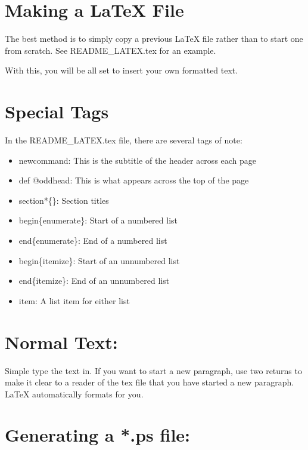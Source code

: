 \documentclass[a4paper,12pt]{article}
\begin{document}
\newcommand{\thisproj}{\bf GUI LaTeX Handbook}

\makeatletter                   %
\pagestyle{myheadings}              %
\def\@oddhead{\bf Aurora - \thisproj \hfill (arsinger)} 
\makeatother     

\section*{Making a LaTeX File}

The best method is to simply copy a previous LaTeX file rather than to start one
from scratch. See README\_LATEX.tex for an example.

With this, you will be all set to insert your own formatted text.

\section*{Special Tags}

In the README\_LATEX.tex file, there are several tags of note:

\begin{itemize}
\item newcommand: This is the subtitle of the header across each page
\item def @oddhead: This is what appears across the top of the page
\item section*\{\}: Section titles
\item begin\{enumerate\}: Start of a numbered list
\item end\{enumerate\}: End of a numbered list
\item begin\{itemize\}: Start of an unnumbered list
\item end\{itemize\}: End of an unnumbered list
\item item: A list item for either list
\end{itemize}

\section*{Normal Text:}

Simple type the text in. If you want to start a new paragraph, use two
returns to make it clear to a reader of the tex file that you have started a
new paragraph. LaTeX automatically formats for you.

\section*{Generating a *.ps file:}
\end{document}
